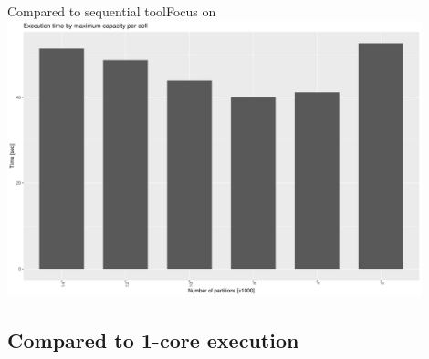 \documentclass{beamer}
\begin{document}
\begin{frame}{Compared to sequential tool}{Focus on}
    \centering 
    \includegraphics[width=0.9\textwidth]{figures/ca_sample.pdf}
\end{frame}

\subsection{Compared to 1-core execution}
\end{document}
